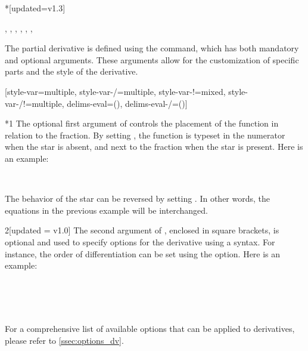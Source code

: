 \begin{function}*{\pdv}[updated=v1.3]
	\begin{syntax}
		\sarg, , , \targ{/}, \targ{!}, , 
	\end{syntax}
	The partial derivative is defined using the  command, which has both mandatory and optional arguments. These arguments allow for the customization of specific parts and the style of the derivative.
	\begin{definition}
		\DeclareDerivative{\pdv}{\partial}[style-var=multiple, style-var-/=multiple,
		style-var-!=mixed, style-var-/!=multiple, delims-eval=(), delims-eval-/=()]
	\end{definition}
	
	\begin{argument}*{1}
		The optional first argument of  controls the placement of the function in relation to the fraction. By setting , the function is typeset in the numerator when the star is absent, and next to the fraction when the star is present. Here is an example:
		\begin{example}
			 \\
		\end{example}
		The behavior of the star can be reversed by setting . In other words, the equations in the previous example will be interchanged.
	\end{argument}
	
	\begin{argument}{2}[updated = v1.0]
		The second argument of , enclosed in square brackets, is optional and used to specify options for the derivative using a  syntax. For instance, the order of differentiation can be set using the  option. Here is an example:
		\begin{example}
			\pdv[order={2,3}]{f}{x,y,z} \\
			\pdv[order={\beta,a,n+2a}]{f}{x,y,z} \\
			\pdv[order={2,n^2,n^2-1}]{f}{x,y,z} \\
			\pdv[order={3/2-n/3,n/2,1/3}]{f}{x,y,z}
		\end{example}
		For a comprehensive list of available options that can be applied to derivatives, please refer to \cref{ssec:options_dv}.
	\end{argument}
	

\end{function}
